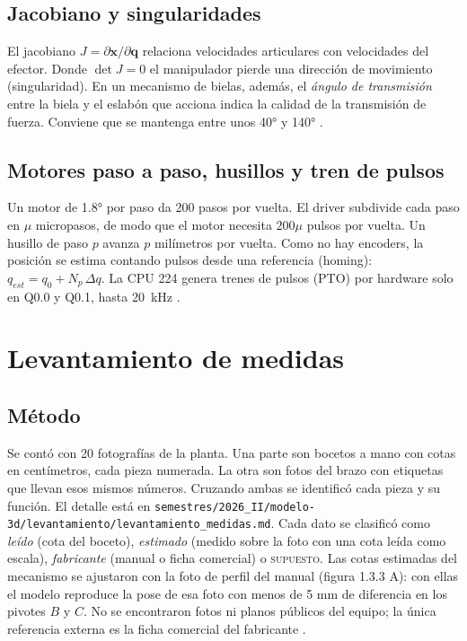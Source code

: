\documentclass[a4paper,12pt]{article}
\newcommand{\supuesto}{\textcolor{naranja}{\textsc{supuesto}}}
\newcommand{\codigo}[1]{\texttt{\small #1}}
\begin{document}
\subsection{Jacobiano y singularidades}
El jacobiano $J = \partial \mathbf{x}/\partial \mathbf{q}$ relaciona velocidades articulares con velocidades
del efector. Donde $\det J = 0$ el manipulador pierde una dirección de movimiento (singularidad). En un
mecanismo de bielas, además, el \emph{ángulo de transmisión} entre la biela y el eslabón que acciona indica
la calidad de la transmisión de fuerza. Conviene que se mantenga entre unos 40° y 140° \cite{norton}.

\subsection{Motores paso a paso, husillos y tren de pulsos}
Un motor de 1.8° por paso da 200 pasos por vuelta. El driver subdivide cada paso en $\mu$ micropasos, de
modo que el motor necesita $200\mu$ pulsos por vuelta. Un husillo de paso $p$ avanza $p$ milímetros por
vuelta. Como no hay encoders, la posición se estima contando pulsos desde una referencia (homing):
$q_{est} = q_0 + N_p\,\Delta q$. La CPU 224 genera trenes de pulsos (PTO) por hardware solo en Q0.0 y Q0.1,
hasta 20~kHz \cite{s7200}.

\section{Levantamiento de medidas}

\subsection{Método}
Se contó con 20 fotografías de la planta. Una parte son bocetos a mano con cotas en centímetros, cada pieza
numerada. La otra son fotos del brazo con etiquetas que llevan esos mismos números. Cruzando ambas se
identificó cada pieza y su función. El detalle está en
\codigo{semestres/2026\_II/modelo-3d/levantamiento/levantamiento\_medidas.md}. Cada dato se clasificó como
\emph{leído} (cota del boceto), \emph{estimado} (medido sobre la foto con una cota leída como escala),
\emph{fabricante} (manual o ficha comercial) o \supuesto. Las cotas estimadas del mecanismo se
ajustaron con la foto de perfil del manual (figura 1.3.3 A): con ellas el modelo reproduce la pose de esa
foto con menos de 5 mm de diferencia en los pivotes $B$ y $C$. No se encontraron fotos ni planos públicos
del equipo; la única referencia externa es la ficha comercial del fabricante \cite{ficha}.
\end{document}
